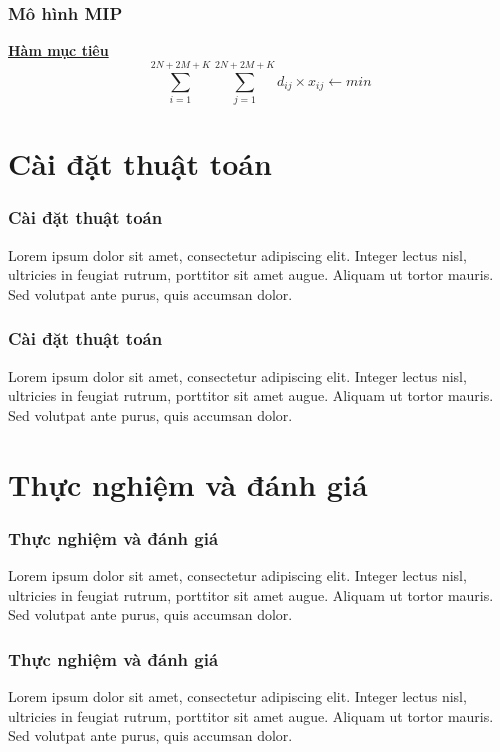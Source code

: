 \documentclass{beamer}
\begin{document}
	\begin{frame}
		\frametitle{Mô hình MIP}
		\textbf{\underline{Hàm mục tiêu}}
		\begin{equation}
			\sum_{i=1}^{2N+2M+K} \sum_{j=1}^{2N+2M+K} d_{ij}\times x_{ij} \leftarrow min
		\end{equation}
	\end{frame}
	
	
	\section{Cài đặt thuật toán}
	
	
	\begin{frame}
		\frametitle{Cài đặt thuật toán}
		Lorem ipsum dolor sit amet, consectetur adipiscing elit. Integer lectus nisl, ultricies in feugiat rutrum, porttitor sit amet augue. Aliquam ut tortor mauris. Sed volutpat ante purus, quis accumsan dolor.
	\end{frame}
	
	
	\begin{frame}
		\frametitle{Cài đặt thuật toán}
		Lorem ipsum dolor sit amet, consectetur adipiscing elit. Integer lectus nisl, ultricies in feugiat rutrum, porttitor sit amet augue. Aliquam ut tortor mauris. Sed volutpat ante purus, quis accumsan dolor.
	\end{frame}
	
	\section{Thực nghiệm và đánh giá}
	
	
	\begin{frame}
		\frametitle{Thực nghiệm và đánh giá}
		Lorem ipsum dolor sit amet, consectetur adipiscing elit. Integer lectus nisl, ultricies in feugiat rutrum, porttitor sit amet augue. Aliquam ut tortor mauris. Sed volutpat ante purus, quis accumsan dolor.
	\end{frame}


	
	\begin{frame}
	\frametitle{Thực nghiệm và đánh giá}
		Lorem ipsum dolor sit amet, consectetur adipiscing elit. Integer lectus nisl, ultricies in feugiat rutrum, porttitor sit amet augue. Aliquam ut tortor mauris. Sed volutpat ante purus, quis accumsan dolor.
	\end{frame}
\end{document}
